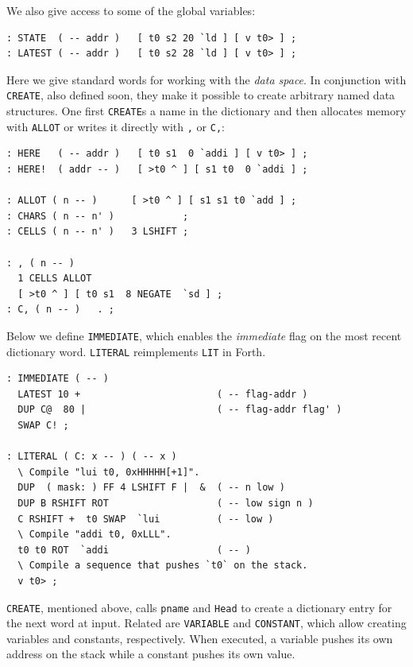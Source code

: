 \documentclass[a4paper,12pt,final]{article}
\begin{document}
We also give access to some of the global variables:

\fontsize{9pt}{9.000000pt}\selectfont
\begin{verbatim}
: STATE  ( -- addr )   [ t0 s2 20 `ld ] [ v t0> ] ;
: LATEST ( -- addr )   [ t0 s2 28 `ld ] [ v t0> ] ;
\end{verbatim}
\normalsize

Here we give standard words for working with the \emph{data space}.  In
conjunction with \texttt{CREATE}, also defined soon, they make it possible to
create arbitrary named data structures.  One first \texttt{CREATE}​s a name in
the dictionary and then allocates memory with \texttt{ALLOT} or writes it
directly with \texttt{,} or \texttt{C,}:

\fontsize{9pt}{9.000000pt}\selectfont
\begin{verbatim}
: HERE   ( -- addr )   [ t0 s1  0 `addi ] [ v t0> ] ;
: HERE!  ( addr -- )   [ >t0 ^ ] [ s1 t0  0 `addi ] ;

: ALLOT ( n -- )      [ >t0 ^ ] [ s1 s1 t0 `add ] ;
: CHARS ( n -- n' )            ;
: CELLS ( n -- n' )   3 LSHIFT ;

: , ( n -- )
  1 CELLS ALLOT
  [ >t0 ^ ] [ t0 s1  8 NEGATE  `sd ] ;
: C, ( n -- )   . ;
\end{verbatim}
\normalsize

Below we define \texttt{IMMEDIATE}, which enables the \emph{immediate} flag on the
most recent dictionary word.  \texttt{LITERAL} reimplements \texttt{LIT} in Forth.

\fontsize{9pt}{9.000000pt}\selectfont
\begin{verbatim}
: IMMEDIATE ( -- ) 
  LATEST 10 +                        ( -- flag-addr )
  DUP C@  80 |                       ( -- flag-addr flag' )
  SWAP C! ;

: LITERAL ( C: x -- ) ( -- x )
  \ Compile "lui t0, 0xHHHHH[+1]".
  DUP  ( mask: ) FF 4 LSHIFT F |  &  ( -- n low )
  DUP B RSHIFT ROT                   ( -- low sign n )
  C RSHIFT +  t0 SWAP  `lui          ( -- low )
  \ Compile "addi t0, 0xLLL".
  t0 t0 ROT  `addi                   ( -- )
  \ Compile a sequence that pushes `t0` on the stack.
  v t0> ;
\end{verbatim}
\normalsize

\texttt{CREATE}, mentioned above, calls \texttt{pname} and \texttt{Head} to create a
dictionary entry for the next word at input.  Related are \texttt{VARIABLE}
and \texttt{CONSTANT}, which allow creating variables and constants,
respectively.  When executed, a variable pushes its own address on the
stack while a constant pushes its own value.
\end{document}
